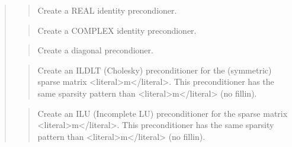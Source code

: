 \documentclass[a4paper,11pt,english]{sphinxmanual}
\begin{document}
\sphinxAtStartPar
{}
\begin{quote}

\sphinxAtStartPar
{}
\begin{quote}

\sphinxAtStartPar
Create a REAL identity precondioner.
\end{quote}

\sphinxAtStartPar
{}
\begin{quote}

\sphinxAtStartPar
Create a COMPLEX identity precondioner.
\end{quote}

\sphinxAtStartPar
{}
\begin{quote}

\sphinxAtStartPar
Create a diagonal precondioner.
\end{quote}

\sphinxAtStartPar
{}
\begin{quote}

\sphinxAtStartPar
Create an ILDLT (Cholesky) preconditioner for the (symmetric) sparse
matrix \textless{}literal\textgreater{}m\textless{}/literal\textgreater{}. This preconditioner has the same sparsity pattern than \textless{}literal\textgreater{}m\textless{}/literal\textgreater{}
(no fill\sphinxhyphen{}in).
\end{quote}

\sphinxAtStartPar
{}
\begin{quote}

\sphinxAtStartPar
Create an ILU (Incomplete LU) preconditioner for the sparse
matrix \textless{}literal\textgreater{}m\textless{}/literal\textgreater{}. This preconditioner has the same sparsity pattern
than \textless{}literal\textgreater{}m\textless{}/literal\textgreater{} (no fill\sphinxhyphen{}in).
\end{quote}

\sphinxAtStartPar
{}
\begin{quote}


\end{quote}
\end{quote}
\end{document}
